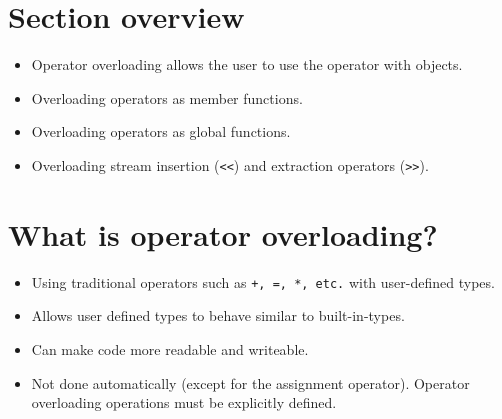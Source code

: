 \section{Section overview}
\begin{itemize}
    \item Operator overloading allows the user to use the operator with objects.
    \item Overloading operators as member functions.
    \item Overloading operators as global functions.
    \item Overloading stream insertion (\texttt{<<}) and extraction operators (\texttt{>>}).
\end{itemize}

\section{What is operator overloading?}
\begin{itemize}
    \item Using traditional operators such as \verb|+, =, *, etc.| with user-defined types.
    \item Allows user defined types to behave similar to built-in-types.
    \item Can make code more readable and writeable.
    \item Not done automatically (except for the assignment operator). Operator overloading operations must be explicitly defined.
\end{itemize}

